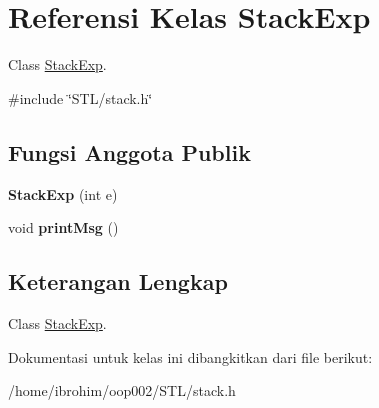 \hypertarget{classStackExp}{}\section{Referensi Kelas Stack\+Exp}
\label{classStackExp}


Class \hyperlink{classStackExp}{Stack\+Exp}.  




{\ttfamily \#include \char`\"{}S\+T\+L/stack.\+h\char`\"{}}

\subsection*{Fungsi Anggota Publik}
\begin{DoxyCompactItemize}
\item 
\hypertarget{classStackExp_a2590e6d22201f3c187d83bf9e626b6e2}{}{\bfseries Stack\+Exp} (int e)\label{classStackExp_a2590e6d22201f3c187d83bf9e626b6e2}

\item 
\hypertarget{classStackExp_a8d3e08d13c04cd4577899971cbda6094}{}void {\bfseries print\+Msg} ()\label{classStackExp_a8d3e08d13c04cd4577899971cbda6094}

\end{DoxyCompactItemize}


\subsection{Keterangan Lengkap}
Class \hyperlink{classStackExp}{Stack\+Exp}. 

Dokumentasi untuk kelas ini dibangkitkan dari file berikut\+:\begin{DoxyCompactItemize}
\item 
/home/ibrohim/oop002/\+S\+T\+L/stack.\+h\end{DoxyCompactItemize}
